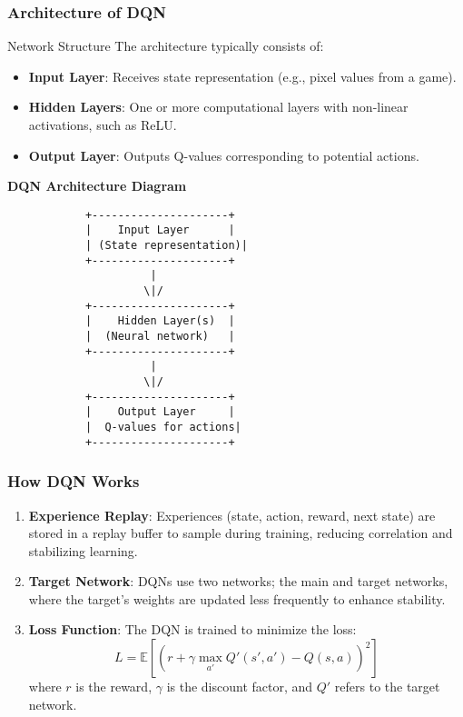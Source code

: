 \documentclass{beamer}
\begin{document}
\begin{frame}[fragile]
    \frametitle{Architecture of DQN}
    \begin{block}{Network Structure}
        The architecture typically consists of:
        \begin{itemize}
            \item \textbf{Input Layer}: Receives state representation (e.g., pixel values from a game).
            \item \textbf{Hidden Layers}: One or more computational layers with non-linear activations, such as ReLU.
            \item \textbf{Output Layer}: Outputs Q-values corresponding to potential actions.
        \end{itemize}
    \end{block}
    \begin{center}
        \textbf{DQN Architecture Diagram}
    \end{center}
    \begin{lstlisting}
            +---------------------+
            |    Input Layer      |
            | (State representation)|
            +---------------------+
                      |
                     \|/
            +---------------------+
            |    Hidden Layer(s)  |
            |  (Neural network)   |
            +---------------------+
                      |
                     \|/
            +---------------------+
            |    Output Layer     |
            |  Q-values for actions|
            +---------------------+
    \end{lstlisting}
\end{frame}

\begin{frame}[fragile]
    \frametitle{How DQN Works}
    \begin{enumerate}
        \item \textbf{Experience Replay}:
        Experiences (state, action, reward, next state) are stored in a replay buffer to sample during training, reducing correlation and stabilizing learning.
        
        \item \textbf{Target Network}:
        DQNs use two networks; the main and target networks, where the target's weights are updated less frequently to enhance stability.
        
        \item \textbf{Loss Function}:
        The DQN is trained to minimize the loss:
        \begin{equation}
            L = \mathbb{E}\left[(r + \gamma \max_{a'} Q'(s', a') - Q(s, a))^2\right]
        \end{equation}
        where \( r \) is the reward, \( \gamma \) is the discount factor, and \( Q' \) refers to the target network.
    \end{enumerate}
\end{frame}
\end{document}
